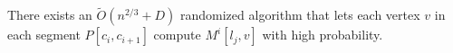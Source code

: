 \begin{lemma} \label{mincheckpoint}
    There exists an $\widetilde{O}(n^{2/3}+D)$ randomized algorithm that lets each vertex $v$ in each segment $P[c_i, c_{i+1}]$  compute $M^i[l_j,v]$ with high probability. 
        \end{lemma}

